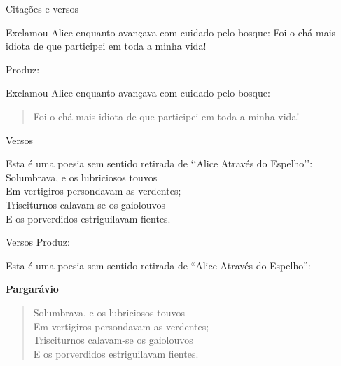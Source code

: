 \begin{frame}{Citações e versos}
\begin{LaTeXcode}[Exemplo]
Exclamou Alice enquanto avançava com cuidado
pelo bosque:\n
{}\n
Foi o chá mais idiota de que participei em
toda a minha vida!\n
{}
\end{LaTeXcode}

Produz:

\begin{LaTeXoutput}
Exclamou Alice enquanto avançava com cuidado
pelo bosque:
\begin{quote}\normalfont
Foi o chá mais idiota de que participei em
toda a minha vida!
\end{quote}
\end{LaTeXoutput}
\end{frame}

\begin{frame}{Versos}
\begin{LaTeXcode}
Esta é uma poesia sem sentido retirada de
`{}`Alice Através do Espelho'{}':
\nn
{}\n
{}\n
{}\n
{}\n
Solumbrava, e os lubriciosos touvos \string\\ \n
Em vertigiros persondavam as verdentes; \string\\ \n
Trisciturnos calavam-se os gaiolouvos \string\\ \n
E os porverdidos estriguilavam fientes.\n
{}
\end{LaTeXcode}
\end{frame}

\begin{frame}{Versos}
Produz:

\begin{LaTeXoutput}
Esta é uma poesia sem sentido retirada de
``Alice Através do Espelho'':

\begin{center}
\textbf{Pargarávio}
\end{center}
\begin{verse}
Solumbrava, e os lubriciosos touvos \\
Em vertigiros persondavam as verdentes; \\
Trisciturnos calavam-se os gaiolouvos \\
E os porverdidos estriguilavam fientes.
\end{verse}
\end{LaTeXoutput}
\end{frame}

